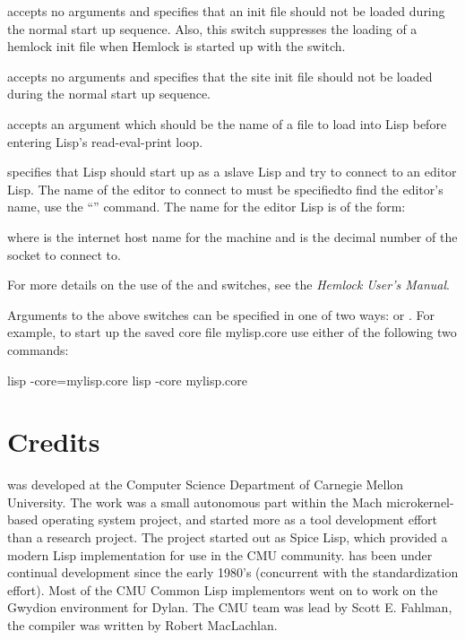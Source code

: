 \begin{Lentry}
\item[\code{-noinit}] accepts no arguments and specifies that an init
  file should not be loaded during the normal start up sequence.
  Also, this switch suppresses the loading of a hemlock init file when
  Hemlock is started up with the  switch.

\item[\code{-nositeinit}] accepts no arguments and specifies that the
  site init file should not be loaded during the normal start up
  sequence. 
\item[\code{-load}] accepts an argument which should be the name of a
  file to load into Lisp before entering Lisp's read-eval-print loop.
  
\item[\code{-slave}] specifies that Lisp should start up as a
  \i{slave} Lisp and try to connect to an editor Lisp.  The name of
  the editor to connect to must be specified\dash{}to find the
  editor's name, use the \hemlock{} ``'' command.  The name for the editor Lisp is of the
  form:
  \begin{example}
    \code{:}
  \end{example}
  where  is the internet host name for the machine
  and  is the decimal number of the socket to connect to.
\end{Lentry}

For more details on the use of the  and 
switches, see the {\it Hemlock User's Manual}.

Arguments to the above switches can be specified in one of two ways:
 or
.  For example, to start up
the saved core file mylisp.core use either of the following two
commands:

\begin{example}
   lisp -core=mylisp.core
   lisp -core mylisp.core
\end{example}


\section{Credits}

\cmucl{} was developed at the Computer Science Department of Carnegie
Mellon University. The work was a small autonomous part within the
Mach microkernel-based operating system project, and started more as a
tool development effort than a research project. The project started
out as Spice Lisp, which provided a modern Lisp implementation for use
in the CMU community. \cmucl{} has been under continual development since
the early 1980's (concurrent with the \clisp{} standardization
effort). Most of the CMU Common Lisp implementors went on to work on
the Gwydion environment for Dylan. The CMU team was lead by Scott E.
Fahlman, the \python{} compiler was written by Robert MacLachlan.

